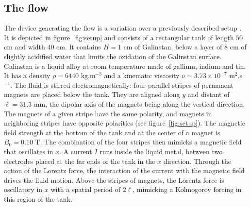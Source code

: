 \documentclass[doublecol]{epl2} %
\begin{document}
\subsection{The flow}

The device generating the flow is a variation over a previously described setup \cite{Gutierrez2016, Gutierrez2016_3}. It is depicted in figure~\ref{fig:setup} and consists of a rectangular tank of length $50$ cm and width $40$ cm. It contains $H=1$ cm of Galinstan, below a layer of $8$ cm of slightly acidified water that limits the oxidation of the Galinstan surface. Galinstan is a liquid alloy at room temperature made of gallium, indium and tin. It has a density  $\rho = 6440$ kg.m$^{-3}$ and a kinematic viscosity $\nu=3.73\times10^{-7}$ m$^2.$s$^{-1}$. The fluid is stirred electromagnetically: four parallel stripes of permanent magnets are placed below the tank. They are aligned along $y$ and distant of $\ell=31.3$ mm, the dipolar axis of the magnets being along the vertical direction. The magnets of a given stripe have the same polarity, and magnets in neighboring stripes have opposite polarities (see figure~\ref{fig:setup}). The magnetic field strength at the bottom of the tank and at the center of a magnet is $B_0=0.10$ T. The combination of the four stripes then mimicks a magnetic field that oscillates in $x$. A current $I$ runs inside the liquid metal, between two electrodes placed at the far ends of the tank in the $x$ direction. Through the action of the Lorentz force, the interaction of the current with the magnetic field drives the fluid motion. Above the stripes of magnets, the Lorentz force is oscillatory in $x$ with a spatial period of $2 \ell$, mimicking a Kolmogorov forcing in this region of the tank. 
\end{document}
